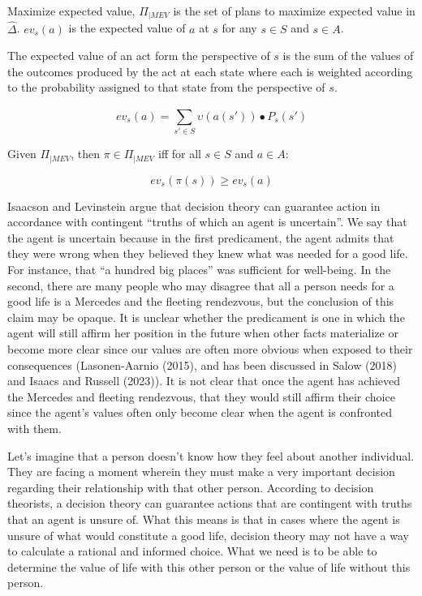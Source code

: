 \documentclass[
  letterpaper,
  DIV=11,
  numbers=noendperiod]{scrartcl}
\begin{document}
Maximize expected value, \(\Pi_{|MEV}\) is the set of plans to maximize
expected value in \(\hat{\Delta}\). \(ev_{s}(a)\) is the expected value
of \(a\) at \(s\) for any \(s \in S\) and \(s \in A\).

The expected value of an act form the perspective of \(s\) is the sum of
the values of the outcomes produced by the act at each state where each
is weighted according to the probability assigned to that state from the
perspective of \(s\).

  
\begin{equation}  
ev_{s}(a) = \sum^{}_{s'\in S} \upsilon(a(s'))\bullet P_{s}(s')  
\end{equation}  

Given \(\Pi_{|MEV}\), then \(\pi \in \Pi_{|MEV}\) iff for all
\(s \in S\) and \(a \in A\):

  
\begin{equation}  
ev_{s}(\pi (s)) \geq ev_{s}(a)  
\end{equation}  

Isaacson and Levinstein argue that decision theory can guarantee action
in accordance with contingent ``truths of which an agent is uncertain''.
We say that the agent is uncertain because in the first predicament, the
agent admits that they were wrong when they believed they knew what was
needed for a good life. For instance, that ``a hundred big places'' was
sufficient for well-being. In the second, there are many people who may
disagree that all a person needs for a good life is a Mercedes and the
fleeting rendezvous, but the conclusion of this claim may be opaque. It
is unclear whether the predicament is one in which the agent will still
affirm her position in the future when other facts materialize or become
more clear since our values are often more obvious when exposed to their
consequences (Lasonen-Aarnio (2015), and has been discussed in Salow
(2018) and Isaacs and Russell (2023)). It is not clear that once the
agent has achieved the Mercedes and fleeting rendezvous, that they would
still affirm their choice since the agent's values often only become
clear when the agent is confronted with them.

Let's imagine that a person doesn't know how they feel about another
individual. They are facing a moment wherein they must make a very
important decision regarding their relationship with that other person.
According to decision theorists, a decision theory can guarantee actions
that are contingent with truths that an agent is unsure of. What this
means is that in cases where the agent is unsure of what would
constitute a good life, decision theory may not have a way to calculate
a rational and informed choice. What we need is to be able to determine
the value of life with this other person or the value of life without
this person.
\end{document}

